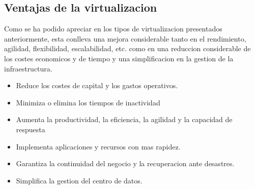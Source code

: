\documentclass[preprint,12pt]{elsarticle}
\begin{document}
\subsection{Ventajas de la virtualizacion}
Como se ha podido apreciar en los tipos de virtualizacion presentados anteriormente, esta conlleva una mejora considerable tanto en el rendimiento, agilidad, flexibilidad, escalabilidad, etc. como en una reduccion considerable de los costes economicos y de tiempo y una simplificacion en la gestion de la infraestructura.
\begin{itemize}
\item Reduce los costes de capital y los gastos operativos.
\item Minimiza o elimina los tiempos de inactividad
\item Aumenta la productividad, la eficiencia, la agilidad y la capacidad de respuesta
\item Implementa aplicaciones y recursos con mas rapidez. 
\item Garantiza la continuidad del negocio y la recuperacion ante desastres.
\item Simplifica la gestion del centro de datos.
\end{itemize}
\end{document}
